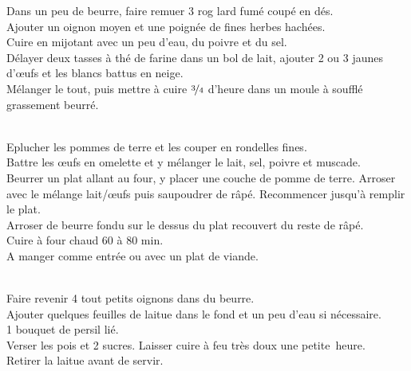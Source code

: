 \begin{minipage}[c]{\textwidth}
Dans un peu de beurre, faire remuer 3 rog lard fumé coupé en dés. \\
Ajouter un oignon moyen et une poignée de fines herbes hachées.\\
Cuire en mijotant avec un peu d’eau, du poivre et du sel. \\
Délayer deux tasses à thé de farine dans un bol de lait, ajouter 2 ou 3 jaunes d’œufs et les blancs battus en neige.\\
Mélanger le tout, puis mettre à cuire $\nicefrac{3}{4}$ d’heure dans un moule à soufflé grassement beurré. \\
\\

\end{minipage}

\begin{minipage}[c]{\textwidth}
Eplucher les pommes de terre et les couper en rondelles fines.\\
Battre les œufs en omelette et y mélanger le lait, sel, poivre et muscade. \\
Beurrer un plat allant au four, y placer une couche de pomme de terre. Arroser avec le mélange lait/œufs puis saupoudrer de râpé. Recommencer jusqu’à remplir le plat. \\
Arroser de beurre fondu sur le dessus du plat recouvert du reste de râpé. \\
Cuire à four chaud 60 à 80 min.\\
A manger comme entrée ou avec un plat de viande.\\
\\

\end{minipage}

\begin{minipage}[c]{\textwidth}
Faire revenir 4 tout petits oignons dans du beurre.\\
Ajouter quelques feuilles de laitue dans le fond et un peu d’eau si nécessaire.\\
1 bouquet de persil lié.\\
Verser les pois et 2 sucres. Laisser cuire à feu très doux une petite heure.\\
Retirer la laitue avant de servir.\\
\\

\end{minipage}

